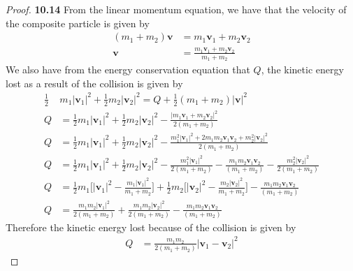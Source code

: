 \documentclass[11pt]{article}
\theoremstyle{definition}
\begin{document}
	\begin{proof}{\textbf{10.14}}
        From the linear momentum equation, we have that the velocity of
        the composite particle is given by 
        \begin{align*}
            (m_1 + m_2)\bm{v} &= m_1\bm{v}_1 + m_2\bm{v}_2\\
            \bm{v} &= \frac{m_1\bm{v}_1 + m_2\bm{v}_2}{m_1 + m_2}
        \end{align*}
        We also have from the energy conservation equation that $Q$,
        the kinetic energy lost as a result of the collision is given by
        \begin{align*}
            \frac{1}{2}&m_1|\bm{v}_1|^2 + \frac{1}{2}m_2|\bm{v}_2|^2
            = Q + \frac{1}{2}(m_1 + m_2)|\bm{v}|^2\\
            Q &= \frac{1}{2}m_1|\bm{v}_1|^2 + \frac{1}{2}m_2|\bm{v}_2|^2
            - \frac{|m_1\bm{v}_1 + m_2\bm{v}_2|^2}{2(m_1 + m_2)}\\
            Q &= \frac{1}{2}m_1|\bm{v}_1|^2 + \frac{1}{2}m_2|\bm{v}_2|^2
            - \frac{m_1^2|\bm{v}_1|^2 + 2m_1m_2\bm{v}_1\bm{v}_2
            + m_2^2|\bm{v}_2|^2}{2(m_1 + m_2)}\\
            Q &= \frac{1}{2}m_1|\bm{v}_1|^2 + \frac{1}{2}m_2|\bm{v}_2|^2
            - \frac{m_1^2|\bm{v}_1|^2}{2(m_1 + m_2)}
            - \frac{m_1m_2\bm{v}_1\bm{v}_2}{(m_1 + m_2)}
            - \frac{m_2^2|\bm{v}_2|^2}{2(m_1 + m_2)}\\
            Q &= \frac{1}{2}m_1\bigg[|\bm{v}_1|^2 -\frac{m_1|\bm{v}_1|^2}{m_1 + m_2}\bigg]
            + \frac{1}{2}m_2\bigg[|\bm{v}_2|^2 - \frac{m_2|\bm{v}_2|^2}{m_1 + m_2}\bigg]
            - \frac{m_1m_2\bm{v}_1\bm{v}_2}{(m_1 + m_2)}\\
            Q &= \frac{m_1m_2|\bm{v}_1|^2}{2(m_1 + m_2)}
            + \frac{m_1m_2|\bm{v}_2|^2}{2(m_1 + m_2)}
            - \frac{m_1m_2\bm{v}_1\bm{v}_2}{(m_1 + m_2)}
        \end{align*}
        Therefore the kinetic energy lost because of the collision is given by
        \begin{align*}
            Q &= \frac{m_1m_2}{2(m_1 + m_2)}|\bm{v}_1 - \bm{v}_2|^2
        \end{align*} 
    \end{proof}
\cleardoublepage
\end{document}
